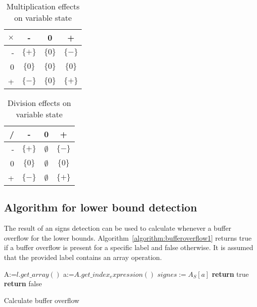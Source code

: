 \begin{table}[H]
\begin{tabular}{| r | c | c | c |}
\hline
  $\times$  & -           & 0 & + \\
\hline
 -  & $\{+\}$ & $\{0\}$ & $\{-\}$ \\
\hline
 0  & $\{0\}$ & $\{0\}$ & $\{0\}$ \\
\hline
 +  & $\{-\}$ & $\{0\}$ & $\{+\}$ \\
\hline
\end{tabular}
\centering
\caption{Multiplication effects on variable state}
\end{table}

\begin{table}[H]
\begin{tabular}{| r | c | c | c |}
\hline
  /  & -           & 0 & + \\
\hline
 -  & $\{+\}$ & $\emptyset$ & $\{-\}$ \\
\hline
 0  & $\{0\}$ & $\emptyset$ & $\{0\}$ \\
\hline
 +  & $\{-\}$ & $\emptyset$ & $\{+\}$ \\
\hline
\end{tabular}
\centering
\caption{Division effects on variable state}
\end{table}


\subsection{Algorithm for lower bound detection}
The result of an signs detection can be used to calculate whenever a buffer overflow for the lower bounds. Algorithm~\ref{algorithm:bufferoverflow1} returns true if a buffer overflow is present for a specific label and false otherwise. It is assumed that the provided label contains an array operation.

\begin{algorithm}
 \begin{algorithmic}[1]
\State A:=$l.get\_array()$
\State a:=$A.get\_index_expression()$
\State $signes:=A_S[a]$
\State \textbf{return} true
\Else
\State \textbf{return} false
\EndIf 
 \EndProcedure
 \end{algorithmic}
 \caption{Calculate buffer overflow}
 \label{algorithm:bufferoverflow1}
\end{algorithm}

